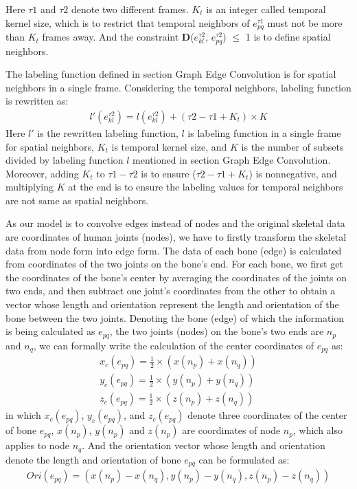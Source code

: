 \documentclass[a4paper,11pt]{article}
\begin{document}
Here $\tau 1$ and $\tau 2$ denote two different frames. 
$K_{t}$ is an integer called temporal kernel size, which is to restrict that temporal neighbors of $e_{pq}^{\tau 1}$ must not be more than $K_{t}$ frames away. And the constraint {\bf D}($e_{kl}^{\tau2}$, $e_{pq}^{\tau2}$) $\leqslant$ 1 is to define spatial neighbors.

The labeling function defined in section Graph Edge Convolution is for spatial neighbors in a single frame. Considering the temporal neighbors, labeling function is rewritten as:
\begin{align}
&l'(e_{kl}^{\tau 2}) = l(e_{kl}^{\tau 2})+(\tau 2  - \tau 1 + K_t) \times K&
\end{align}
Here $l'$ is the rewritten labeling function, $l$ is labeling function in a single frame for spatial neighbors, $K_t$ is temporal kernel size, and $K$ is the number of subsets divided by labeling function $l$ mentioned in section Graph Edge Convolution. Moreover, adding $K_t$ to $\tau1-\tau2$ is to ensure (${\tau2-\tau1+K_t}$) is nonnegative, and multiplying $K$ at the end is to ensure the labeling values for temporal neighbors are not same as spatial neighbors.

As our model is to convolve edges instead of nodes and the original skeletal data are coordinates of human joints (nodes), we have to firstly transform the skeletal data from node form into edge form. The data of each bone (edge) is calculated from coordinates of the two joints on the bone's end. For each bone, we first get the coordinates of the bone's center by averaging the coordinates of the joints on two ends, and then subtract one joint's coordinates from the other to obtain a vector whose length and orientation represent the length and orientation of the bone between the two joints. Denoting the bone (edge) of which the information is being calculated as $e_{pq}$, the two joints (nodes) on the bone's two ends are $n_p$ and $n_q$, we can formally write the calculation of the center coordinates of $e_{pq}$ as:
\begin{align}
&x_c(e_{pq}) = \frac{1}{2} \times (x(n_p) + x(n_q))&\\
&y_c(e_{pq}) = \frac{1}{2} \times (y(n_p) + y(n_q))&\\
&z_c(e_{pq}) = \frac{1}{2} \times (z(n_p) + z(n_q))&
\end{align}
in which $x_c(e_{pq})$, $y_c(e_{pq})$, and $z_c(e_{pq})$ denote three coordinates of the center of bone $e_{pq}$, $x(n_p)$, $y(n_p)$ and $z(n_p)$ are coordinates of node $n_p$, which also applies to node $n_q$. And the orientation vector whose length and orientation denote the length and orientation of bone $e_{pq}$ can be formulated as:
\begin{align}
&Ori(e_{pq}) = (x(n_p) - x(n_q), y(n_p) - y(n_q), z(n_p) - z(n_q))&
\end{align}
\end{document}
